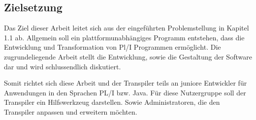      
     
     



% 	 
%	 
%
    
\subsection{Zielsetzung}
Das Ziel dieser Arbeit leitet sich aus der eingeführten Problemstellung in Kapitel 1.1 ab. Allgemein soll ein plattformunabhängiges Programm entstehen, dass die  Entwicklung und Transformation von Pl/I Programmen ermöglicht. Die zugrundeliegende Arbeit stellt die Entwicklung, sowie die Gestaltung der Software dar und wird schlussendlich diskutiert. 

Somit richtet sich diese Arbeit und der Transpiler teils an juniore Entwickler für Anwendungen in den Sprachen PL/I bzw. Java. Für diese Nutzergruppe soll der Transpiler ein Hilfswerkzeug darstellen. Sowie Administratoren, die den Transpiler anpassen und erweitern möchten. 
	
